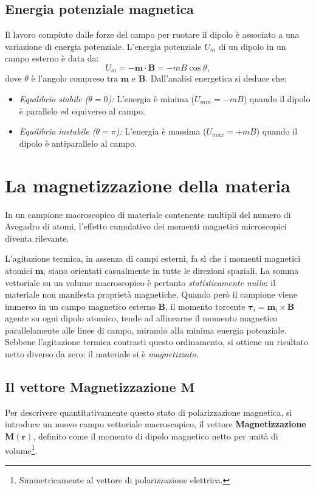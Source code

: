 \documentclass[a4paper,11pt]{report}
\begin{document}
\subsection{Energia potenziale magnetica}
Il lavoro compiuto dalle forze del campo per ruotare il dipolo è associato a una variazione di energia potenziale. L'energia potenziale $U_m$ di un dipolo in un campo esterno è data da:
\begin{equation}
    U_m = - \bm{m} \cdot \bm{B} = - m B \cos\theta,
\end{equation}
dove $\theta$ è l'angolo compreso tra $\bm{m}$ e $\bm{B}$.
Dall'analisi energetica si deduce che:
\begin{itemize}
    \item \textit{Equilibrio stabile ($\theta = 0$):} L'energia è minima ($U_{min} = -mB$) quando il dipolo è parallelo ed equiverso al campo.
    \item \textit{Equilibrio instabile ($\theta = \pi$):} L'energia è massima ($U_{max} = +mB$) quando il dipolo è antiparallelo al campo.
\end{itemize}

\section{La magnetizzazione della materia}

In un campione macroscopico di materiale contenente multipli del numero di Avogadro di atomi, l'effetto cumulativo dei momenti magnetici microscopici diventa rilevante.

L'agitazione termica, in assenza di campi esterni, fa sì che i momenti magnetici atomici $\bm{m}_i$ siano orientati casualmente in tutte le direzioni spaziali. La somma vettoriale su un volume macroscopico è pertanto \textit{statisticamente nulla}: il materiale non manifesta proprietà magnetiche.
Quando però il campione viene immerso in un campo magnetico esterno $\bm{B}$, il momento torcente $\bm{\tau}_i = \bm{m}_i \times \bm{B}$ agente su ogni dipolo atomico, tende ad allinearne il momento magnetico parallelamente alle linee di campo, mirando alla minima energia potenziale.
Sebbene l'agitazione termica contrasti questo ordinamento, si ottiene un risultato netto diverso da zero: il materiale si è \textit{magnetizzato}.

\subsection{Il vettore Magnetizzazione \texorpdfstring{$\bm{M}$}{M}}
Per descrivere quantitativamente questo stato di polarizzazione magnetica, si introduce un nuovo campo vettoriale macroscopico, il vettore \textbf{Magnetizzazione} $\bm{M}(\bm{r})$, definito come il momento di dipolo magnetico netto per unità di volume\footnote{Simmetricamente al vettore di polarizzazione elettrica.}.
\end{document}

